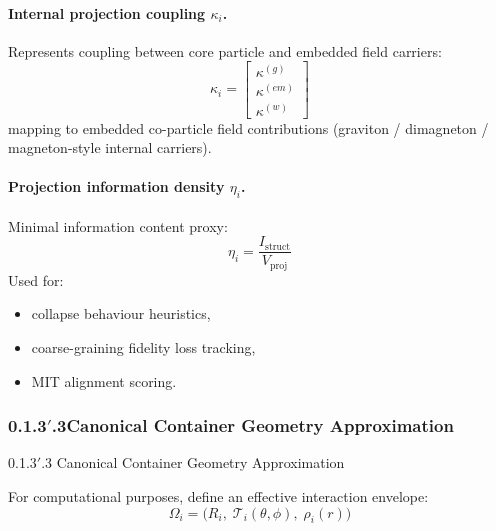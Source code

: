 \documentclass[11pt, a4paper, oneside]{article}
\theoremstyle{definition}
\theoremstyle{remark}
\begin{document}
\paragraph{Internal projection coupling
          \texorpdfstring{$\kappa_i$}{kappa-i}.}

Represents coupling between core particle and embedded field
carriers:
%
\begin{equation}
  \kappa_i =
  \begin{bmatrix}
    \kappa^{(g)} \\[3pt]
    \kappa^{(em)} \\[3pt]
    \kappa^{(w)}
  \end{bmatrix}
  \label{eq:kappa}
\end{equation}
%
mapping to embedded co-particle field contributions (graviton /
dimagneton / magneton-style internal carriers).

\paragraph{Projection information density
          \texorpdfstring{$\eta_i$}{eta-i}.}

Minimal information content proxy:
%
\begin{equation}
  \eta_i = \frac{I_{\text{struct}}}{V_{\text{proj}}}
  \label{eq:info-density}
\end{equation}
%
Used for:
\begin{itemize}
  \item collapse behaviour heuristics,
  \item coarse-graining fidelity loss tracking,
  \item MIT alignment scoring.
\end{itemize}

\subsubsection*{0.1.3$'$.3\quad Canonical Container Geometry
               Approximation}
%
  {0.1.3$'$.3 Canonical Container Geometry Approximation}
\label{sec:container-geometry}

For computational purposes, define an effective interaction envelope:
%
\begin{equation}
  \Omega_i =
  \bigl(
    R_i,\;
    \mathcal{T}_i(\theta,\phi),\;
    \rho_i(r)
  \bigr)
  \label{eq:envelope}
\end{equation}
\end{document}
